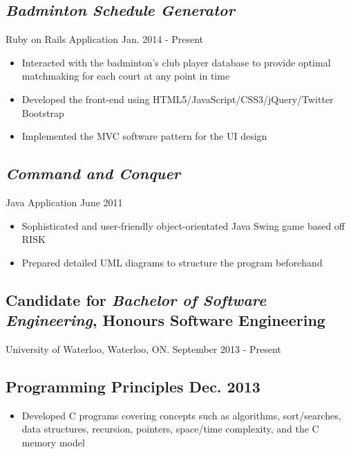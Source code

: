 \documentclass[10pt]{article}
\begin{document}
\begin{minipage}[t]{0.84\linewidth}
	\subsection*{\textit{Badminton Schedule Generator}} \vspace{-6pt} 
		Ruby on Rails Application \hspace{190pt} Jan. 2014 - Present
		\begin{itemize}
			\item Interacted with the badminton's club player database to provide optimal matchmaking for each court at any point in time 
			\item Developed the front-end using HTML5/JavaScript/CSS3/jQuery/Twitter Bootstrap
			\item Implemented the MVC software pattern for the UI design 
		\end{itemize}	
	
	\subsection*{\textit{Command and Conquer}} \vspace{-6pt}
		Java Application \hspace{267pt} June 2011
		\begin{itemize}
			\item Sophisticated and user-friendly object-orientated Java Swing game based off RISK
			\item Prepared detailed UML diagrams to structure the program beforehand
		\end{itemize}
	
	\subsection*{Candidate for \textit{Bachelor of Software Engineering}, Honours Software Engineering} 								\vspace{-6pt}
		University of Waterloo, Waterloo, ON. \hspace{105pt} September 2013 - Present

	\subsection*{Programming Principles \hspace{220pt} \textnormal{Dec. 2013}} \vspace{-6pt}
		\begin{itemize}
			\item Developed C programs covering concepts such as algorithms, sort/searches, data structures, recursion, pointers, space/time complexity, and the C memory model
		\end{itemize}
	

\end{minipage}
\end{document}
